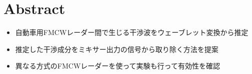\section{Abstract}
\begin{itemize}
    \item 自動車用FMCWレーダー間で生じる干渉波をウェーブレット変換から推定
    \item 推定した干渉成分をミキサー出力の信号から取り除く方法を提案
    \item 異なる方式のFMCWレーダーを使って実験も行って有効性を確認
\end{itemize}
